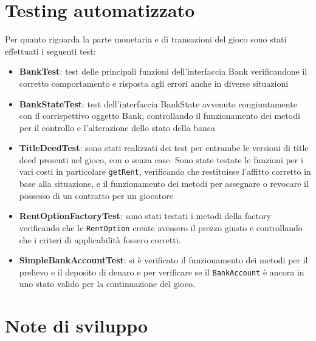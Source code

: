 \section{Testing automatizzato}
Per quanto riguarda la parte monetaria e di transazioni del gioco sono stati effettuati i seguenti test:\newline
\begin{itemize}
    \item \textbf{BankTest}: test delle principali funzioni dell'interfaccia Bank verificandone il corretto comportamento e risposta agli errori anche in diverse situazioni
    \item \textbf{BankStateTest}: test dell'interfaccia BankState avvenuto congiuntamente con il corrispettivo oggetto Bank, controllando il funzionamento dei metodi per il controllo e l'alterazione dello stato della banca 
    \item \textbf{TitleDeedTest}: sono stati realizzati dei test per entrambe le versioni di title deed presenti nel gioco, con o senza case. Sono state testate le funzioni per i vari costi in particolare \texttt{getRent}, verificando che restituisse l'affitto corretto in base alla situazione, e il funzionamento dei metodi per assegnare o revocare il possesso di un contratto per un giocatore
    \item \textbf{RentOptionFactoryTest}: sono stati testati i metodi della factory verificando che le \texttt{RentOption} create avessero il prezzo giusto e controllando che i criteri di applicabilità fossero corretti.
    \item \textbf{SimpleBankAccountTest}: si è verificato il funzionamento dei metodi per il prelievo e il deposito di denaro e per verificare se il \texttt{BankAccount} è ancora in uno stato valido per la continuazione del gioco.  
\end{itemize}
\section{Note di sviluppo}
